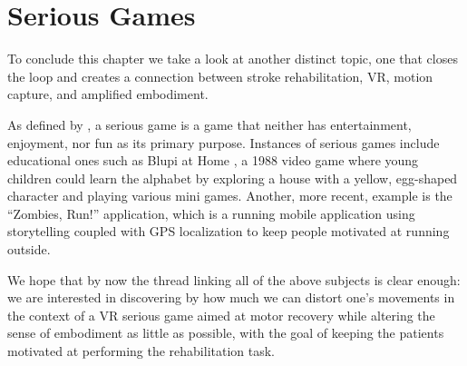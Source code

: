\section{Serious Games}

To conclude this chapter we take a look at another distinct topic, one that closes the loop and creates a connection between stroke rehabilitation, VR, motion capture, and amplified embodiment.

As defined by \cite{djaouti2011classifying,chen2005proof}, a serious game is a game that neither has entertainment, enjoyment, nor fun as its primary purpose. Instances of serious games include educational ones such as Blupi at Home \cite{epsitec1988blupi}, a 1988 video game where young children could learn the alphabet by exploring a house with a yellow, egg-shaped character and playing various mini games. Another, more recent, example is the ``Zombies, Run!'' \cite{six2017zombie} application, which is a running mobile application using storytelling coupled with GPS localization to keep people motivated at running outside.

We hope that by now the thread linking all of the above subjects is clear enough: we are interested in discovering by how much we can distort one's movements in the context of a VR serious game aimed at motor recovery while altering the sense of embodiment as little as possible, with the goal of keeping the patients motivated at performing the rehabilitation task.
